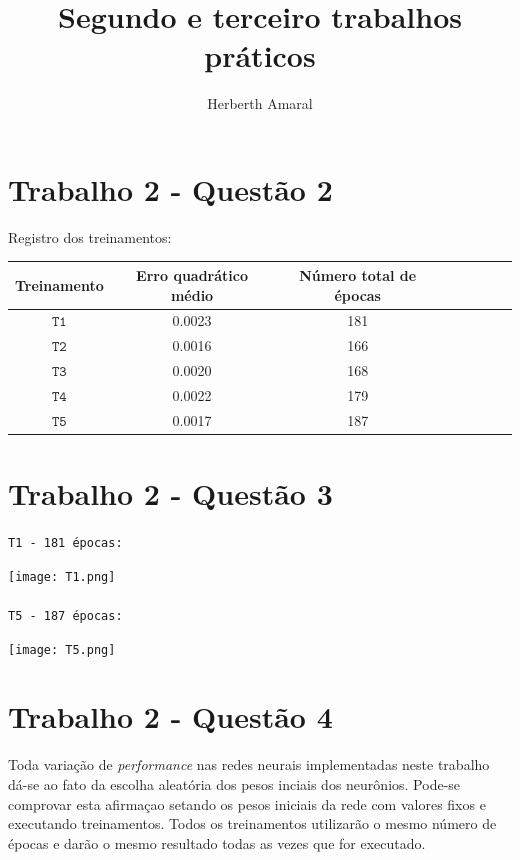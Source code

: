 \documentclass[a4paper]{article}
\title{Segundo e terceiro trabalhos pr\'aticos }
\author{Herberth Amaral}
\begin{document}
\maketitle
\section*{Trabalho 2 - Quest\~ao 2}

Registro dos treinamentos:

\begin{center}
\begin{tabular}{|c|c|c|c|c|c|c|c|}
\hline
Treinamento & Erro quadr\'atico m\'edio & N\'umero total de \'epocas  \\ \hline
$\texttt{T1}$ & 0.0023 & 181  \\ \hline
$\texttt{T2}$ & 0.0016 & 166  \\ \hline
$\texttt{T3}$ & 0.0020 & 168  \\ \hline
$\texttt{T4}$ & 0.0022 & 179  \\ \hline
$\texttt{T5}$ & 0.0017 & 187  \\ \hline
\end{tabular}
\end{center}

\section*{Trabalho 2 - Quest\~ao 3}

\texttt{T1 - 181 \'epocas:}

\texttt{[image: T1.png]}

\paragraph{}
\texttt{T5 - 187 \'epocas:}

\texttt{[image: T5.png]}

\section*{Trabalho 2 - Quest\~ao 4}

Toda varia\c{c}\~ao de \textit{performance} nas redes neurais implementadas neste trabalho d\'a-se ao fato da escolha aleat\'oria dos pesos inciais dos neur\^onios. Pode-se comprovar esta afirma\c{c}ao setando os pesos iniciais da rede com valores fixos e executando treinamentos. Todos os treinamentos utilizar\~ao o mesmo número de \'epocas e dar\~ao o mesmo resultado todas as vezes que for executado.
\end{document}

